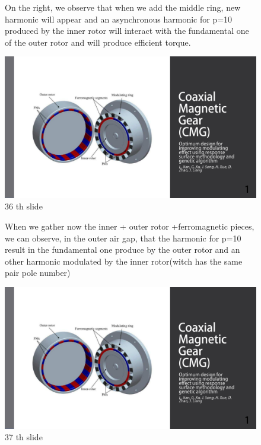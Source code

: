 \begin{figure}[H]
    \begin{minipage}{.45\linewidth}
    On the right, we observe that when we add the middle ring, new harmonic will appear and an asynchronous harmonic for p=10 produced by the inner rotor will interact with the fundamental one of the outer rotor and will produce efficient torque.
 
       
    \end{minipage}
    \hfill%
    \begin{minipage}[c]{.45\linewidth}
        \centering
        \includegraphics[page={36},width=\textwidth]{LELEC2311.allow.pdf}
        \caption{36 th slide}
    \end{minipage}
\end{figure}

\begin{figure}[H]
    \begin{minipage}{.45\linewidth}
    When we gather now the inner + outer rotor +ferromagnetic pieces, we can observe, in the outer air gap, that the harmonic for p=10 result in the fundamental one produce by the outer rotor and an other harmonic modulated by the inner rotor(witch has the same pair pole number)
 
       
    \end{minipage}
    \hfill%
    \begin{minipage}[c]{.45\linewidth}
        \centering
        \includegraphics[page={37},width=\textwidth]{LELEC2311.allow.pdf}
        \caption{37 th slide}
    \end{minipage}
\end{figure}

